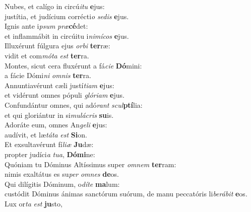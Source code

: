 \evenverse Nubes, et calígo in circú\textit{i}\textit{tu} \textbf{e}jus:~\*\\
\evenverse justítia, et judícium corrécti\textit{o} \textit{se}\textit{dis} \textbf{e}jus.\\
\oddverse Ignis ante i\textit{psum} \textit{præ}\textbf{cé}det:~\*\\
\oddverse et inflammábit in circúitu i\textit{ni}\textit{mí}\textit{cos} \textbf{e}jus.\\
\evenverse Illuxérunt fúlgura ejus \textit{or}\textit{bi} \textbf{ter}ræ:~\*\\
\evenverse vidit et com\textit{mó}\textit{ta} \textit{est} \textbf{ter}ra.\\
\oddverse Montes, sicut cera fluxérunt a fá\textit{ci}\textit{e} \textbf{Dó}mini:~\*\\
\oddverse a fácie Dómi\textit{ni} \textit{om}\textit{nis} \textbf{ter}ra.\\
\evenverse Annuntiavérunt cæli justí\textit{ti}\textit{am} \textbf{e}jus:~\*\\
\evenverse et vidérunt omnes pópuli \textit{gló}\textit{ri}\textit{am} \textbf{e}jus.\\
\oddverse Confundántur omnes, qui adó\textit{rant} \textit{scul}\textbf{ptí}lia:~\*\\
\oddverse et qui gloriántur in si\textit{mu}\textit{lá}\textit{cris} \textbf{su}is.\\
\evenverse Adoráte eum, omnes An\textit{ge}\textit{li} \textbf{e}jus:~\*\\
\evenverse audívit, et læ\textit{tá}\textit{ta} \textit{est} \textbf{Si}on.\\
\oddverse Et exsultavérunt fí\textit{li}\textit{æ} \textbf{Ju}dæ:~\*\\
\oddverse propter judíci\textit{a} \textit{tu}\textit{a}, \textbf{Dó}\textbf{mi}ne:\\
\evenverse Quóniam tu Dóminus Altíssimus super \textit{om}\textit{nem} \textbf{ter}ram:~\*\\
\evenverse nimis exaltátus es su\textit{per} \textit{om}\textit{nes} \textbf{de}os.\\
\oddverse Qui dilígitis Dóminum, o\textit{dí}\textit{te} \textbf{ma}lum:~\*\\
\oddverse custódit Dóminus ánimas sanctórum suórum, de manu peccatóris li\textit{be}\textit{rá}\textit{bit} \textbf{e}os.\\
\evenverse Lux or\textit{ta} \textit{est} \textbf{ju}sto,~\*\\
